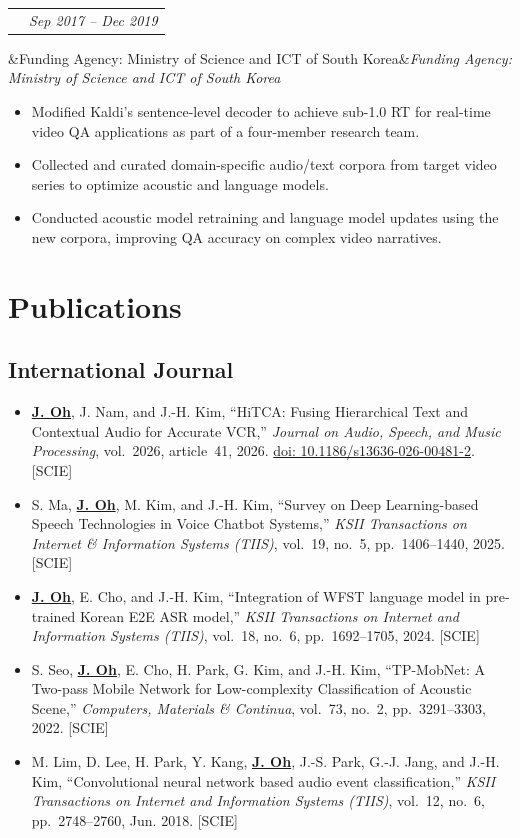 \documentclass[a4paper,9pt]{extarticle}
\makeatletter
\newlength{\cvdatewidth}
\newenvironment{blockitems}{%
  \begin{itemize}[leftmargin=1.4em, itemsep=5pt, topsep=4pt, parsep=0pt, partopsep=0pt]
}{%
  \end{itemize}
}
\newcommand{\entrytitle}[1]{{\fontsize{10.5}{13}\selectfont\bfseries #1}}
\newcommand{\me}[1]{\textbf{\underline{#1}}}
\newcommand{\researchentry}[4]{%
  \vspace{0.55em}
  \noindent
  \begin{tabularx}{\textwidth}{@{}>{\raggedright\arraybackslash}X >{\raggedleft\arraybackslash}p{\cvdatewidth}@{}}
    \entrytitle{#1} & \textit{#2} \\
  \end{tabularx}
  \ifx&#3&\else\noindent\textit{#3}\par\fi
  \vspace{0.1em}
  \begin{itemize}[leftmargin=1.4em, itemsep=1pt, topsep=2pt, parsep=0pt]
    #4
  \end{itemize}
  \vspace{0.25em}
}
\makeatother
\begin{document}
\researchentry{Development of a Video Story Understanding-based QA System to Pass the Video Turing Test}{Sep 2017 -- Dec 2019}{Funding Agency: Ministry of Science and ICT of South Korea}{
  \item Modified Kaldi's sentence-level decoder to achieve sub-1.0 RT for real-time video QA applications as part of a four-member research team.
  \item Collected and curated domain-specific audio/text corpora from target video series to optimize acoustic and language models.
  \item Conducted acoustic model retraining and language model updates using the new corpora, improving QA accuracy on complex video narratives.
}

\section*{Publications}
\subsection*{International Journal}
\begin{blockitems}
  \item \me{J. Oh}, J. Nam, and J.-H. Kim, ``HiTCA: Fusing Hierarchical Text and Contextual Audio for Accurate VCR,'' \textit{Journal on Audio, Speech, and Music Processing}, vol.~2026, article~41, 2026. \href{https://doi.org/10.1186/s13636-026-00481-2}{doi: 10.1186/s13636-026-00481-2}. [SCIE]
  \item S. Ma, \me{J. Oh}, M. Kim, and J.-H. Kim, ``Survey on Deep Learning-based Speech Technologies in Voice Chatbot Systems,'' \textit{KSII Transactions on Internet \& Information Systems (TIIS)}, vol.~19, no.~5, pp.~1406--1440, 2025. [SCIE]
  \item \me{J. Oh}, E. Cho, and J.-H. Kim, ``Integration of WFST language model in pre-trained Korean E2E ASR model,'' \textit{KSII Transactions on Internet and Information Systems (TIIS)}, vol.~18, no.~6, pp.~1692--1705, 2024. [SCIE]
  \item S. Seo, \me{J. Oh}, E. Cho, H. Park, G. Kim, and J.-H. Kim, ``TP-MobNet: A Two-pass Mobile Network for Low-complexity Classification of Acoustic Scene,'' \textit{Computers, Materials \& Continua}, vol.~73, no.~2, pp.~3291--3303, 2022. [SCIE]
  \item M. Lim, D. Lee, H. Park, Y. Kang, \me{J. Oh}, J.-S. Park, G.-J. Jang, and J.-H. Kim, ``Convolutional neural network based audio event classification,'' \textit{KSII Transactions on Internet and Information Systems (TIIS)}, vol.~12, no.~6, pp.~2748--2760, Jun. 2018. [SCIE]
\end{blockitems}
\end{document}
